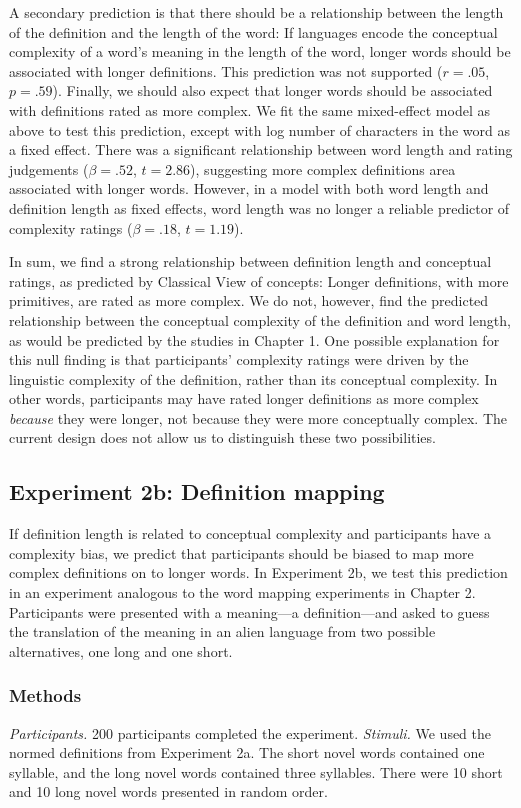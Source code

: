 A secondary prediction is that there should be a relationship between the length of the definition and the length of the word: If languages encode the conceptual complexity of a word's meaning in the length of the word, longer words should be associated with longer definitions. This prediction was not supported ($r=.05$, $p =.59$). Finally, we should also expect that  longer words should be associated with definitions rated as more complex. We fit the same mixed-effect model as above to test this prediction, except with log number of characters in the word as a fixed effect. There was a significant relationship between word length and rating judgements ($\beta=.52$, $t =2.86$), suggesting more complex definitions area associated with longer words. However, in a model with both word length and definition length as fixed effects, word length was no longer a reliable predictor of complexity ratings ($\beta=.18$, $t =1.19$).

In sum, we find a strong relationship between definition length and conceptual ratings, as predicted by Classical View of concepts: Longer definitions, with more primitives, are rated as more complex. We do not, however, find the predicted relationship between the conceptual complexity of the definition and word length, as would be predicted by the studies in Chapter 1.  One possible explanation for this null finding is that participants' complexity ratings were driven by the linguistic complexity of the definition, rather than its conceptual complexity. In other words, participants may have  rated longer definitions as more complex {\it because} they were longer, not because they were more conceptually complex. The current design does not allow us to distinguish these two possibilities.

\subsection{Experiment 2b: Definition mapping}
If definition length is related to conceptual complexity and participants have a complexity bias, we predict that participants should be biased to map more complex definitions on to longer words. In Experiment 2b, we test this prediction in an experiment analogous to the word mapping experiments in Chapter 2. Participants were presented with a meaning---a definition---and asked to guess the translation of the meaning in an alien language from two possible alternatives, one long and one short. 

\subsubsection{Methods}
{\it Participants.} 
200 participants completed the experiment.
{\it Stimuli.} 
We used the normed definitions from Experiment 2a. The short novel words contained one syllable, and the long novel words contained three syllables. There were 10 short and 10 long novel words presented in random order. 

